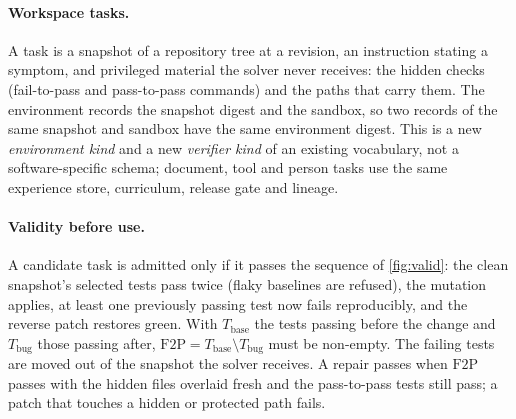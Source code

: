 \paragraph{Workspace tasks.} A task is a snapshot of a repository tree at a revision, an
instruction stating a symptom, and privileged material the solver never receives:
the hidden checks (fail-to-pass and pass-to-pass commands) and the paths that carry
them. The environment records the snapshot digest and the sandbox, so two records of
the same snapshot and sandbox have the same environment digest. This is a new
\emph{environment kind} and a new \emph{verifier kind} of an existing vocabulary, not
a software-specific schema; document, tool and person tasks use the same experience
store, curriculum, release gate and lineage.

\paragraph{Validity before use.} A candidate task is admitted only if it passes the
sequence of \cref{fig:valid}: the clean snapshot's selected tests pass twice (flaky
baselines are refused), the mutation applies, at least one previously passing test now
fails reproducibly, and the reverse patch restores green. With
$T_{\mathrm{base}}$ the tests passing before the change and $T_{\mathrm{bug}}$ those
passing after, $\mathrm{F2P}=T_{\mathrm{base}}\setminus T_{\mathrm{bug}}$ must be
non-empty. The failing tests are moved out of the snapshot the solver receives. A
repair passes when $\mathrm{F2P}$ passes with the hidden files overlaid fresh and the
pass-to-pass tests still pass; a patch that touches a hidden or protected path fails.

